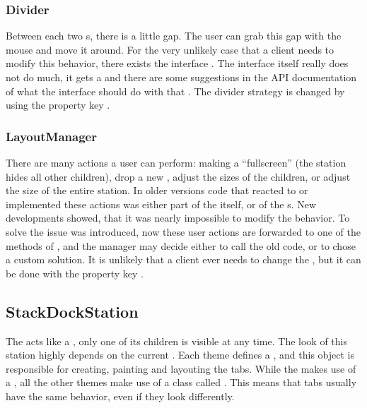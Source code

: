 \subsubsection{Divider}
Between each two s, there is a little gap. The user can grab this gap with the mouse and move it around. For the very unlikely case that a client needs to modify this behavior, there exists the interface . The interface itself really does not do much, it gets a  and there are some suggestions in the API documentation of what the interface should do with that . The divider strategy is changed by using the property key .

\subsubsection{LayoutManager}
There are many actions a user can perform: making a  ``fullscreen'' (the station hides all other children), drop a new , adjust the sizes of the children, or adjust the size of the entire station. In older versions code that reacted to or implemented these actions was either part of the  itself, or of the s. New developments showed, that it was nearly impossible to modify the behavior. To solve the issue  was introduced, now these user actions are forwarded to one of the methods of , and the manager may decide either to call the old code, or to chose a custom solution. It is unlikely that a client ever needs to change the , but it can be done with the property key .

\subsection{StackDockStation}
The  acts like a , only one of its children is visible at any time. The look of this station highly depends on the current . Each theme defines a , and this object is responsible for creating, painting and layouting the tabs. While the  makes use of a , all the other themes make use of a class called . This means that tabs usually have the same behavior, even if they look differently.

